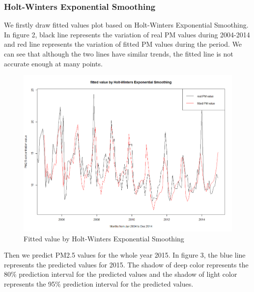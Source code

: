 \documentclass[10pt]{article}
\begin{document}



\subsubsection{Holt-Winters Exponential Smoothing}
We firstly draw fitted values plot based on Holt-Winters Exponential Smoothing. In figure 2, black line represents the variation of real PM values during 2004-2014 and red line represents the variation of fitted PM values during the period. We can see that although the two lines have similar trends, the fitted line is not accurate enough at many points.

\begin{figure}[H]
\centering
\includegraphics[width = 150mm]{ts2.png}
\caption{Fitted value by Holt-Winters Exponential Smoothing}
\end{figure}

Then we predict PM2.5 values for the whole year 2015. In figure 3, the blue line represents the predicted values for 2015. The shadow of deep color represents the 80\% prediction interval for the predicted values and the shadow of light color represents the 95\% prediction interval for the predicted values.
\end{document}
